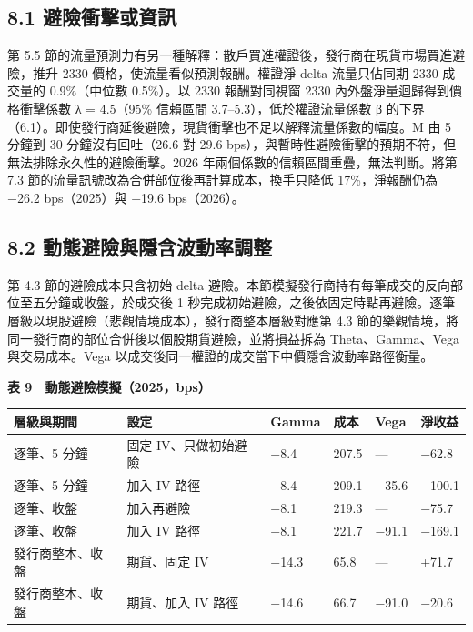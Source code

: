 \documentclass[12pt,a4paper]{article}
\begin{document}
\subsection*{8.1 避險衝擊或資訊}

第 5.5 節的流量預測力有另一種解釋：散戶買進權證後，發行商在現貨市場買進避險，推升 2330 價格，使流量看似預測報酬。權證淨 delta 流量只佔同期 2330 成交量的 0.9\%（中位數 0.5\%）。以 2330 報酬對同視窗 2330 內外盤淨量迴歸得到價格衝擊係數 λ = 4.5（95\% 信賴區間 3.7–5.3），低於權證流量係數 β 的下界（6.1）。即使發行商延後避險，現貨衝擊也不足以解釋流量係數的幅度。M 由 5 分鐘到 30 分鐘沒有回吐（26.6 對 29.6 bps），與暫時性避險衝擊的預期不符，但無法排除永久性的避險衝擊。2026 年兩個係數的信賴區間重疊，無法判斷。將第 7.3 節的流量訊號改為合併部位後再計算成本，換手只降低 17\%，淨報酬仍為 −26.2 bps（2025）與 −19.6 bps（2026）。

\subsection*{8.2 動態避險與隱含波動率調整}

第 4.3 節的避險成本只含初始 delta 避險。本節模擬發行商持有每筆成交的反向部位至五分鐘或收盤，於成交後 1 秒完成初始避險，之後依固定時點再避險。逐筆層級以現股避險（悲觀情境成本），發行商整本層級對應第 4.3 節的樂觀情境，將同一發行商的部位合併後以個股期貨避險，並將損益拆為 Theta、Gamma、Vega 與交易成本。Vega 以成交後同一權證的成交當下中價隱含波動率路徑衡量。

\begin{center}\textbf{表 9　動態避險模擬（2025，bps）}\end{center}\vspace{-0.8em}

\begin{center}\small
\begin{tabularx}{\linewidth}{Ylllll}
\toprule
\textbf{層級與期間} & \textbf{設定} & \textbf{Gamma} & \textbf{成本} & \textbf{Vega} & \textbf{淨收益} \\
\midrule
逐筆、5 分鐘 & 固定 IV、只做初始避險 & −8.4 & 207.5 & — & −62.8 \\
逐筆、5 分鐘 & 加入 IV 路徑 & −8.4 & 209.1 & −35.6 & −100.1 \\
逐筆、收盤 & 加入再避險 & −8.1 & 219.3 & — & −75.7 \\
逐筆、收盤 & 加入 IV 路徑 & −8.1 & 221.7 & −91.1 & −169.1 \\
發行商整本、收盤 & 期貨、固定 IV & −14.3 & 65.8 & — & +71.7 \\
發行商整本、收盤 & 期貨、加入 IV 路徑 & −14.6 & 66.7 & −91.0 & −20.6 \\
\bottomrule
\end{tabularx}
\end{center}
\end{document}

